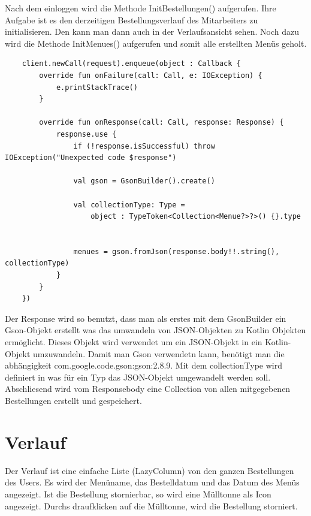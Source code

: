 Nach dem einloggen wird die Methode InitBestellungen() aufgerufen. Ihre Aufgabe ist es den derzeitigen Bestellungsverlauf des Mitarbeiters zu initialisieren.
Den kann man dann auch in der Verlaufsansicht sehen. Noch dazu wird die Methode InitMenues() aufgerufen und somit alle erstellten Menüs geholt.


\begin{lstlisting}
    client.newCall(request).enqueue(object : Callback {
        override fun onFailure(call: Call, e: IOException) {
            e.printStackTrace()
        }

        override fun onResponse(call: Call, response: Response) {
            response.use {
                if (!response.isSuccessful) throw IOException("Unexpected code $response")

                val gson = GsonBuilder().create()

                val collectionType: Type =
                    object : TypeToken<Collection<Menue?>?>() {}.type


                menues = gson.fromJson(response.body!!.string(), collectionType)
            }
        }
    })
\end{lstlisting}


Der Response wird so benutzt, dass man als erstes mit dem GsonBuilder ein Gson-Objekt erstellt
 was das umwandeln von JSON-Objekten zu Kotlin Objekten ermöglicht. 
Dieses Objekt wird verwendet um ein JSON-Objekt in ein Kotlin-Objekt umzuwandeln. 
Damit man Gson verwendetn kann, benötigt man die abhängigkeit com.google.code.gson:gson:2.8.9.
Mit dem collectionType wird definiert in was für ein Typ das JSON-Objekt umgewandelt werden soll.
Abschliesend wird vom Responsebody eine Collection von allen mitgegebenen Bestellungen erstellt und gespeichert.


\pagebreak

\section{Verlauf}

Der Verlauf ist eine einfache Liste (LazyColumn) von den ganzen Bestellungen des Users.
Es wird der Menüname, das Bestelldatum und das Datum des Menüs angezeigt.
Ist die Bestellung stornierbar, so wird eine Mülltonne als Icon angezeigt. 
Durchs draufklicken auf die Mülltonne, wird die Bestellung storniert.

